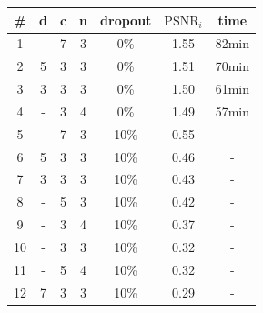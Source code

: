 \documentclass{beamer}
\begin{document}
\begin{frame}
\begin{columns}[t]
        \begin{table}[h]
            \small
            \centering
            \begin{tabular}{c | c | c | c | c | c | c}
                \#  & d & c & n & dropout & $\text{PSNR}_i$ & time \\
                \hline
                \hline
                1  & -             & 7          & 3           & 0\%     & 1.55        & 82min                                                                    \\
                \hline
                2  & 5             & 3          & 3           & 0\%     & 1.51        & 70min                                                                    \\
                \hline
                3  & 3             & 3          & 3           & 0\%     & 1.50        & 61min                                                                    \\
                \hline
                4  & -             & 3          & 4           & 0\%     & 1.49        & 57min                                                                    \\
                \hline
                5  & -             & 7          & 3           & 10\%     & 0.55       & -                                                                     \\
                \hline
                6  & 5             & 3          & 3           & 10\%     & 0.46       & -                                                                     \\
                \hline
                7  & 3             & 3          & 3           & 10\%     & 0.43       & -                                                                     \\
                \hline
                8  & -             & 5          & 3           & 10\%     & 0.42       & -                                                                     \\
                \hline
                9  & -             & 3          & 4           & 10\%     & 0.37       & -                                                                     \\
                \hline
                10  & -             & 3          & 3           & 10\%     & 0.32      & -                                                                      \\
                \hline
                11  & -             & 5          & 4           & 10\%     & 0.32      & -                                                                      \\
                \hline
                12  & 7             & 3          & 3           & 10\%     & 0.29      & -
            \end{tabular}
            \label{tab:mresults}
        \end{table}
    \end{columns}
\end{frame}
\end{document}
